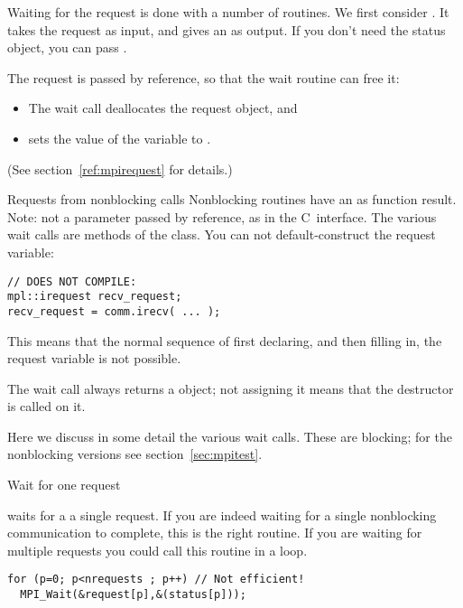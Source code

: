 Waiting for the request is done with a number of routines. We first
consider . It takes the request as input, and
gives an  as output. If you don't need the
status object, you can pass .


The request is passed by reference, so that the wait routine
can free it:
\begin{itemize}
\item The wait call deallocates the request object, and
\item sets the value of the variable to .
\end{itemize}
(See section~\ref{ref:mpirequest} for details.)

\begin{mplnote}{Requests from nonblocking calls}
  \label{mpl:irequest}
  Nonblocking routines have an  as function result.
  Note: not a parameter passed by reference, as in the C~interface.
  The various wait calls are methods of the 
  class.
  You can not default-construct the request variable:
\begin{lstlisting}
// DOES NOT COMPILE:
mpl::irequest recv_request;
recv_request = comm.irecv( ... );
\end{lstlisting}
This means that the normal sequence of first declaring, and then filling in,
the request variable is not possible.

\begin{mplimpl}
  The wait call always returns a  object;
  not assigning it means that the destructor is called on it.
\end{mplimpl}
\end{mplnote}


Here we discuss in some detail the various wait calls.
These are blocking; for the nonblocking versions
see section~\ref{sec:mpitest}.

 {Wait for one request}

 waits for a a single request. If you are
indeed waiting for a single nonblocking communication to complete,
this is the right routine. If you are waiting for multiple requests
you could call this routine in a loop.

\begin{lstlisting}
for (p=0; p<nrequests ; p++) // Not efficient!
  MPI_Wait(&request[p],&(status[p]));
\end{lstlisting}

